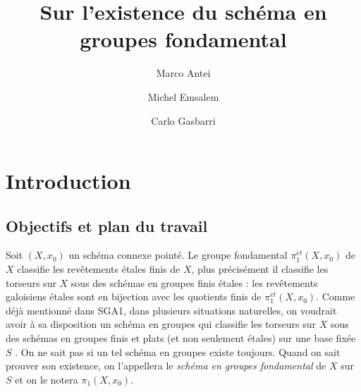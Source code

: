 \documentclass[11pt]{amsart}
\title{Sur l'existence du sch\'ema en groupes fondamental}
\author{Marco Antei}
\author{Michel Emsalem}
\author{Carlo Gasbarri}
\numberwithin{equation}{section}
\theoremstyle{definition}
\theoremstyle{remark}
\begin{document}

\removeabove{0.5cm}
\removebetween{0.5cm}
\removebelow{0.5cm}

\maketitle


\begin{prelims}

\DisplayAbstractInFrench

\bigskip

\DisplayKeyWordsfr

\medskip

\DisplayMSCclassfr

\bigskip


\bigskip

\DisplayTitleInEnglish

\medskip

\DisplayAbstractInEnglish

\end{prelims}



\newpage

\setcounter{tocdepth}{1} 

\tableofcontentsfr




\section{Introduction}

\subsection{Objectifs et plan du travail}

Soit $(X,x_0)$ un sch\'ema connexe point\'e. Le groupe fondamental $\pi_1^{\acute{e}t}(X, x_0)$ de $X$ classifie les rev\^etements \'etales finis de $X$, plus pr\'ecis\'ement il classifie les torseurs sur $X$ sous des sch\'emas en groupes finis \'etales : les rev\^etements galoisiens \'etales sont en bijection avec les quotients finis de  $\pi_1^{\acute{e}t}(X, x_0)$. Comme d\'ej\`a mentionn\'e dans SGA1, dans plusieurs situations naturelles, on voudrait avoir \`a sa disposition un sch\'ema en groupes qui classifie les torseurs sur $X$ sous des sch\'emas en groupes finis et plats (et non seulement \'etales) sur une base fix\'ee $S$ . On ne sait pas si un tel sch\'ema en groupes existe toujours. Quand on sait prouver son existence, on l'appellera le {\it sch\'ema en groupes fondamental} de $X$ sur $S$ et on le notera $\pi_1(X,x_0)$.
\end{document}
